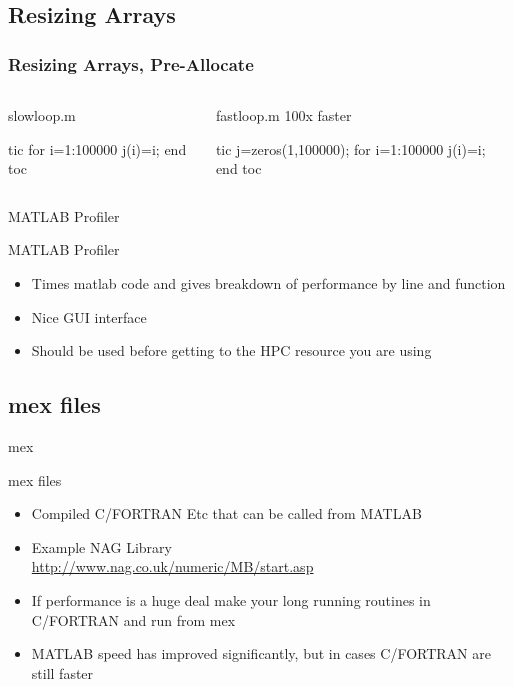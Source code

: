 \documentclass[handout]{beamer}
\begin{document}
   \subsection{Resizing Arrays}
\begin{frame}[fragile]
\frametitle{Resizing Arrays, Pre-Allocate}
\begin{columns}[T]
\begin{column}{5cm}
 \begin{block}{slowloop.m}
  \begin{semiverbatim}
tic
for i=1:100000
    j(i)=i;
end
toc
  \end{semiverbatim}
 \end{block}
\end{column}
\begin{column}{5cm}
\begin{block}{fastloop.m 100x faster}
\begin{semiverbatim}
tic
j=zeros(1,100000);
for i=1:100000
    j(i)=i;
end
toc
\end{semiverbatim}
\end{block}
\end{column}
\end{columns}
\end{frame}

\begin{frame}{MATLAB Profiler}
 \begin{block}{MATLAB Profiler}
  \begin{itemize}
   \item Times matlab code and gives breakdown of performance by line and function
   \item Nice GUI interface
   \item Should be used before getting to the HPC resource you are using
  \end{itemize}
 \end{block}
\end{frame}

   \subsection{mex files}
\begin{frame}{mex}
\begin{block}{mex files}
 \begin{itemize}
  \item Compiled C/FORTRAN Etc that can be called from MATLAB
  \item Example NAG Library \\
\url{http://www.nag.co.uk/numeric/MB/start.asp}
  \item If performance is a huge deal make your long running routines in C/FORTRAN and run from mex
  \item MATLAB speed has improved significantly, but in cases C/FORTRAN are still faster
 \end{itemize}
\end{block}
%
\end{frame}
\end{document}
